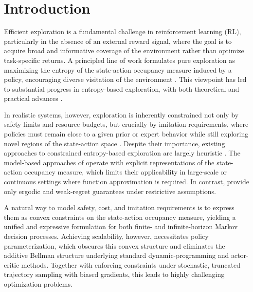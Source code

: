 \documentclass{article}
\theoremstyle{plain}
\theoremstyle{definition}
\theoremstyle{remark}
\begin{document}
\section{Introduction}
Efficient exploration is a fundamental challenge in reinforcement learning
(RL), particularly in the absence of an external reward signal, where the
goal is to acquire broad and informative coverage of the environment rather
than optimize task-specific returns. A principled line of work formulates
pure exploration as maximizing the entropy of the state-action occupancy
measure induced by a policy, encouraging diverse visitation of the
environment \cite{hazanProvablyEfficientMaximum2019}. This viewpoint has
led to substantial progress in entropy-based exploration, with both
theoretical and practical advances
\cite{muttiTaskAgnosticExplorationPolicy2021, tiapkinFastRatesMaximum2023}.

In realistic systems, however, exploration is inherently constrained not
only by safety limits and resource budgets, but crucially by imitation
requirements, where policies must remain close to a given prior or expert
behavior while still exploring novel regions of the state-action space
\cite{dulac-arnoldChallengesRealworldReinforcement2021}. Despite their
importance, existing approaches to constrained entropy-based exploration
are largely heuristic \cite{yangCEMConstrainedEntropy2023,
 tiboniDomainRandomizationEntropy2024}. The model-based approaches of
\citet{agarwalConcaveUtilityReinforcement2022a,
 baiAchievingZeroConstraint2023a} operate with explicit representations of
the state-action occupancy measure, which limits their applicability in
large-scale or continuous settings where function approximation is
required. In contrast, \citet{yingPolicybasedPrimalDualMethods2025} provide
only ergodic and weak-regret guarantees under restrictive assumptions.

A natural way to model safety, cost, and imitation requirements is to
express them as convex constraints on the state-action occupancy measure,
yielding a unified and expressive formulation for both finite- and
infinite-horizon Markov decision processes. Achieving scalability, however,
necessitates policy parameterization, which obscures this convex structure
and eliminates the additive Bellman structure underlying standard
dynamic-programming and actor-critic methods. Together with enforcing
constraints under stochastic, truncated trajectory sampling with biased
gradients, this leads to highly challenging optimization problems.
\end{document}
